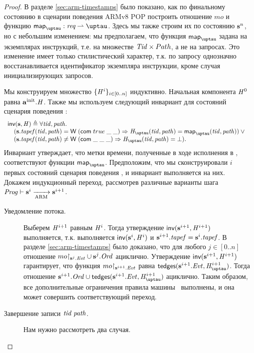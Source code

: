 \begin{proof}
  В разделе \ref{sec:arm-timestamps} было показано, как по финальному состоянию в
  сценарии поведения ARMv8 POP построить отношение $mo$ и функцию
  $\taumapping : \Request \rightharpoonup \tau$.
  Здесь мы также строим их по состоянию $\mathbf{s}^n$, но с небольшим изменением:
  мы предполагаем, что  функция $\taumapping$ задана на экземплярах инструкций,
  т.е. на множестве $\mathit{Tid} \times Path$, а не на запросах.
  Это изменение имеет только стилистический характер, т.к. по запросу
  однозначно восстанавливается идентификатор экземпляра инструкции,
  кроме случая инициализирующих запросов.

  Мы конструируем множество $\{\mathit{H}^i \}_{i \in [0..n]}$ индуктивно.
  Начальная компонента $\mathit{H}^0$ равна $\mathbf{a}^{\rm init}.\mathit{H}$.
  Также мы используем следующий инвариант для состояний сценария поведения \ARMt:
  \[\begin{array}{l}
  \invTT(\s, \hmap) \triangleq \forall \tId, \cpath. \\
  \quad (\s.\tapef(\tId, \cpath) = \tapeWrite{(\tapeWriteCommitted{true}{\_}{\_})} \Rightarrow
         \tmap(\tId, \cpath) = \taumapping(\tId, \cpath)) \lor {} \\
  \quad (\s.\tapef(\tId, \cpath) \not = \tapeWrite{(\tapeWriteCommitted{\_}{\_}{\_})} \Rightarrow
         \tmap(\tId, \cpath) = \bot).
  \end{array}\]
  Инвариант утверждает, что метки времени, полученные в ходе исполнения в \ARMt,
  соответствуют функции $\taumapping$. 
  Предположим, что мы сконструировали $i$ первых состояний сценария поведения \ARMt,
  и инвариант выполняется на них.
  Докажем индукционный переход, рассмотрев различные варианты шага $\mathit{Prog} \vdash \mathbf{s}^i \xrightarrow[\text{ARM}]{} \mathbf{s}^{i + 1}$.
  \begin{description}
  \item[Уведомление потока.]
    Выберем $\mathit{H}^{i + 1}$ равным $\mathit{H}^{i}$. 
    Тогда утверждение $\textsf{inv}(\mathbf{s}^{i + 1}, \mathit{H}^{i + 1})$ выполняется, т.к.
    выполняется $\textsf{inv}(\mathbf{s}^{i}, \mathit{H}^{i})$ и
    $\mathbf{s}^{i + 1}.\mathit{tapef} = \mathbf{s}^{i}.\mathit{tapef}$.
    В разделе \ref{sec:arm-timestamps} было доказано, что
    для любого $j \in [0..n]$ отношение $mo{\restriction_{\mathbf{s}^j.\mathit{Evt}}} \cup \mathbf{s}^j.\mathit{Ord}$ ациклично.
    Утверждение $\textsf{inv}(\mathbf{s}^{i + 1}, \mathit{H}^{i + 1})$ гарантирует, что
    функция $mo{\restriction_{\mathbf{s}^{i+1}.\mathit{Evt}}}$ равна $\moTau(\s^{i+1}.\Evt, \tmap^{i+1})$.
    Тогда отношение $\s^{i+1}.\Ord \cup \moTau(\s^{i+1}.\Evt, \tmap^{i+1})$ ациклично.
    Таким образом, все дополнительные ограничения правила 
    машины \ARMt~выполнены, и она может совершить соответствующий переход.
  \item[Завершение записи $\mathit{tid} \; \mathit{path}$.]
    Нам нужно рассмотреть два случая.
    

\end{description}
\end{proof}
